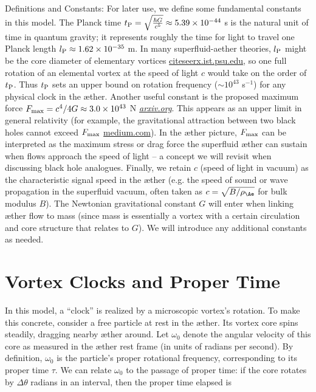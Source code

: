 \documentclass[aps,preprint,superscriptaddress]{revtex4}
\begin{document}
    Definitions and Constants: For later use, we define some fundamental constants in this model. The Planck time $t_{\rm P} = \sqrt{\frac{\hbar G}{c^5}} \approx 5.39\times10^{-44}$ s is the natural unit of time in quantum gravity; it represents roughly the time for light to travel one Planck length $l_{\rm P}\approx1.62\times10^{-35}$ m. In many superfluid-aether theories, $l_{\rm P}$ might be the core diameter of elementary vortices
    \href{https://citeseerx.ist.psu.edu/document?repid=rep1&type=pdf&doi=25483f1ebc9dc442a9f1505a49d96eb35e92e3f4#:~:text=45,on%20General%20Relativity%20and%20Relativistic}{citeseerx.ist.psu.edu}, so one full rotation of an elemental vortex at the speed of light $c$ would take on the order of $t_{\rm P}$. Thus $t_{\rm P}$ sets an upper bound on rotation frequency ($\sim10^{43}$ s$^{-1}$) for any physical clock in the æther. Another useful constant is the proposed maximum force $F_{\rm max}=c^4/4G \approx 3.0\times10^{43}$ N
    \href{https://arxiv.org/abs/2205.06302#:~:text=the%20principle%20of%20maximum%20force,The%20limits%20illuminate}{\textit{arxiv.org}}. This appears as an upper limit in general relativity (for example, the gravitational attraction between two black holes cannot exceed $F_{\rm max}$
    \href{https://medium.com/@motionmountain/4-there-is-a-maximum-force-in-nature-d87e1951e9a4#:~:text=,implies%20inverse%20square%20gravity}{medium.com}). In the æther picture, $F_{\rm max}$ can be interpreted as the maximum stress or drag force the superfluid æther can sustain when flows approach the speed of light – a concept we will revisit when discussing black hole analogues. Finally, we retain $c$ (speed of light in vacuum) as the characteristic signal speed in the æther (e.g. the speed of sound or wave propagation in the superfluid vacuum, often taken as $c=\sqrt{B/\rho_{\Ae}}$ for bulk modulus $B$). The Newtonian gravitational constant $G$ will enter when linking æther flow to mass (since mass is essentially a vortex with a certain circulation and core structure that relates to $G$). We will introduce any additional constants as needed.


\section*{Vortex Clocks and Proper Time}

In this model, a “clock” is realized by a microscopic vortex’s rotation. To make this concrete, consider a free particle at rest in the æther. Its vortex core spins steadily, dragging nearby æther around. Let $\omega_0$ denote the angular velocity of this core as measured in the æther rest frame (in units of radians per second). By definition, $\omega_0$ is the particle’s proper rotational frequency, corresponding to its proper time $\tau$. We can relate $\omega_0$ to the passage of proper time: if the core rotates by $\Delta \theta$ radians in an interval, then the proper time elapsed is
\end{document}
